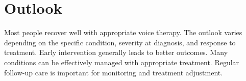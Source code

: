 \section{Outlook}
Most people recover well with appropriate voice therapy. The outlook varies depending on the specific condition, severity at diagnosis, and response to treatment. Early intervention generally leads to better outcomes. Many conditions can be effectively managed with appropriate treatment. Regular follow-up care is important for monitoring and treatment adjustment.
